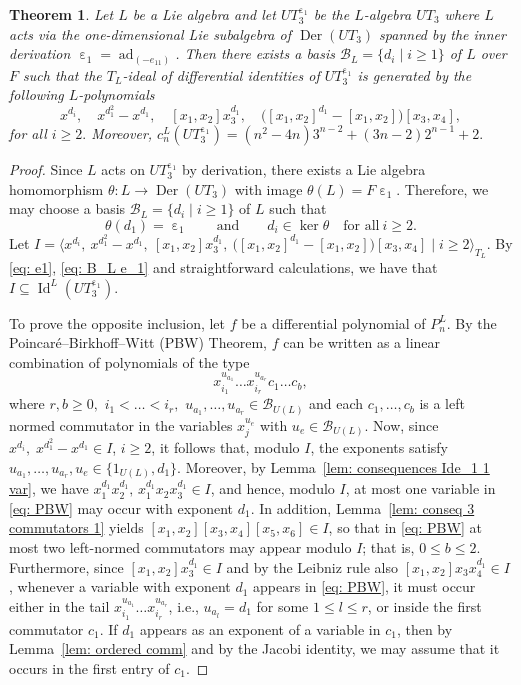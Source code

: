 \documentclass[a4paper,reqno]{amsart}
\newtheorem{theorem}{Theorem}
\theoremstyle{definition}
\numberwithin{equation}{section}
\numberwithin{theorem}{section}
\DeclareMathOperator{\I}{Id}
\newcommand{\B}{\mathcal{B}}
\DeclareMathOperator{\e}{\varepsilon}
\DeclareMathOperator{\ad}{ad}
\DeclareMathOperator{\D}{Der}
\begin{document}
\begin{theorem}\label{Teo: Id^L UT_3 epsilon1}
Let $L$ be a Lie algebra and let $UT_3^{\e_1}$  be  the $L$-algebra $UT_3$ where $L$ acts via the one-dimensional Lie subalgebra of $\D(UT_3)$ spanned by the inner derivation $\e_1=\ad_{(-e_{11})}$. Then 
there exists a basis $\mathcal{B}_L=\{d_i \mid i \geq 1\}$ of $L$ over $F$ such that 
the $T_L$-ideal of differential identities of $UT_3^{\e_1}$ is generated by the following $L$-polynomials
$$
x^{d_i}, \quad  x^{d_1^2}-x^{d_1}, \quad [x_1,x_2]x_3^{d_1}, \quad \big([x_1,x_2]^{d_1}-[x_1,x_2]\big)[x_3,x_4],
$$
for all  $i\geq 2.$ Moreover,
 $c_n^L(UT_3^{\e_1})=(n^2-4n)3^{n-2}+ (3n-2)2^{n-1} +2.$ 
\end{theorem}
\begin{proof}
 Since $L$ acts on $UT_3^{\e_1}$ by derivation, there exists a Lie algebra homomorphism $\theta\colon L \to  \D(UT_3)$ with image $\theta(L)=F\e_1$. Therefore, we may choose a basis $\mathcal{B}_L=\{d_i \mid i \geq 1\}$ of $L$ such that
 \begin{equation}\label{eq: B_L e_1}
      \theta(d_1)=\e_1 \qquad \mbox{and} \qquad d_i\in \ker \theta \quad \mbox{for all} \ i\geq 2.
 \end{equation}
Let $I=\langle x^{d_i}, \  x^{d_1^2}-x^{d_1}, \ [x_1,x_2]x_3^{d_1}, \ \big([x_1,x_2]^{d_1}-[x_1,x_2]\big)[x_3,x_4] \mid i\geq 2 \rangle_{T_L}$. By \eqref{eq: e1}, \eqref{eq: B_L e_1} and straightforward calculations, we have that $I\subseteq\I^L(UT_3^{\e_1}).$ 



     To prove the opposite inclusion, let  $f$ be a differential polynomial of $P_n^L.$ By the Poincaré--Birkhoff--Witt (PBW) Theorem, $f$ can be written as a linear combination of polynomials of the type
     \begin{equation}\label{eq: PBW}
          x_{i_1}^{u_{a_1}}\dots x_{i_r}^{u_{a_r}} c_1 \dots c_b,
     \end{equation}
     where $r,b\geq 0,$ $i_1< \dots < i_r,$ $u_{a_1}, \ldots, u_{a_r}\in \B_{U(L)}$ and each $c_1, \ldots, c_b$ is a left normed commutator in the variables $x_j^{u_e}$ with $u_e\in \B_{U(L)}.$ Now, since $x^{d_i}, \; x^{d_1^2}-x^{d_1}\in I$, $i\geq 2$, it follows that, modulo $I$, the exponents satisfy $u_{a_1}, \ldots, u_{a_r}, u_e \in \{1_{U(L)}, d_1\}.$ Moreover, by Lemma~\ref{lem: consequences Ide_1 1 var}, we have $x_1^{d_1}x_2^{d_1},\, x_1^{d_1}x_2 x_3^{d_1} \in I$, and hence, modulo $I$, at most one variable in \eqref{eq: PBW} may occur with exponent $d_1$. In addition, Lemma~\ref{lem: conseq 3 commutators 1} yields $[x_1,x_2][x_3,x_4][x_5,x_6]\in I$, so that in \eqref{eq: PBW} at most two left-normed commutators may appear modulo $I$; that is, $0\leq b\leq 2$. Furthermore, since $[x_1,x_2]x_3^{d_1}\in I$ and by the Leibniz rule also $[x_1,x_2]x_3x_4^{d_1}\in I$, whenever a variable with exponent $d_1$ appears in \eqref{eq: PBW}, it must occur either in the tail $x_{i_1}^{u_{a_1}}\dots x_{i_r}^{u_{a_r}} $, i.e., $u_{a_l}=d_1$ for some $1\leq l \leq r$, or inside the first commutator $c_1$.
     If $d_1$ appears as an exponent of a variable in $c_1$, then by Lemma~\ref{lem: ordered comm} and by the Jacobi identity, we may assume that it occurs in the first entry of $c_1.$


\end{proof}
\end{document}
